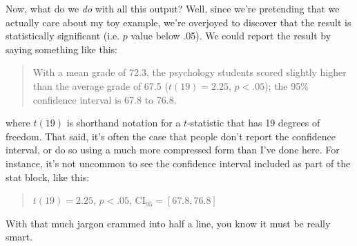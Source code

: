 Now, what do we {\it do} with all this output? Well, since we're pretending that we actually care about my toy example, we're overjoyed to discover that the result is statistically significant (i.e. $p$ value below .05). We could report the result by saying something like this:
\begin{quote}
With a mean grade of 72.3, the psychology students scored slightly higher than the average grade of 67.5 ($t(19) = 2.25$, $p<.05$); the 95\% confidence interval is 67.8 to 76.8.
\end{quote}
where $t(19)$ is shorthand notation for a $t$-statistic that has 19 degrees of freedom. That said, it's often the case that people don't report the confidence interval, or do so using a much more compressed form than I've done here. For instance, it's not uncommon to see the confidence interval included as part of the stat block, like this:
\begin{quote}
$t(19) = 2.25$, $p<.05$, CI$_{95} = [67.8, 76.8]$
\end{quote}
With that much jargon crammed into half a line, you know it must be really smart.


